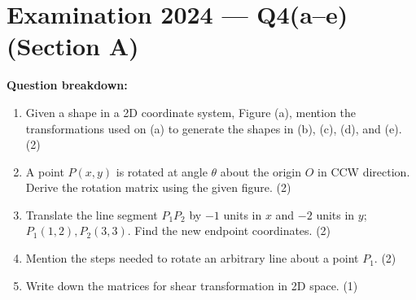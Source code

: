 \documentclass[12pt, a4paper]{article}
\newenvironment{solutionbox}{\begin{mdframed}[style=solutionframe]}{\end{mdframed}}
\begin{document}
\section{Examination 2024 --- Q4(a--e) (Section A)}
\begin{solutionbox}
\textbf{Question breakdown:}
\begin{enumerate}[noitemsep]
  \item[(a)] Given a shape in a 2D coordinate system, Figure (a), mention the transformations used on (a) to generate the shapes in (b), (c), (d), and (e). (2)
  \item[(b)] A point $P(x,y)$ is rotated at angle $\theta$ about the origin $O$ in CCW direction. Derive the rotation matrix using the given figure. (2)
  \item[(c)] Translate the line segment $P_1P_2$ by $-1$ units in $x$ and $-2$ units in $y$; $P_1(1,2), P_2(3,3)$. Find the new endpoint coordinates. (2)
  \item[(d)] Mention the steps needed to rotate an arbitrary line about a point $P_1$. (2)
  \item[(e)] Write down the matrices for shear transformation in 2D space. (1)
\end{enumerate}
\end{solutionbox}
\end{document}
